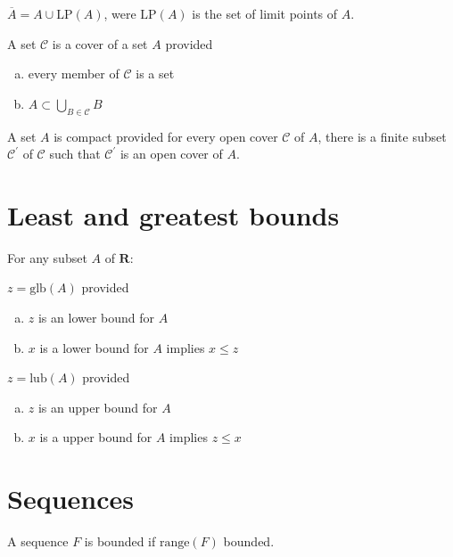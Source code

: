 \documentclass[letterpaper,landscape,9pt,fleqn]{extarticle}
\newcommand{\range}{\mathrm{range}}
\newcommand{\reals}{\mathbf{R}}
\newcommand{\glb}{\mathrm{glb}}
\newcommand{\lub}{\mathrm{lub}}
\newenvironment{alphalist}{
  \begin{enumerate}[(a)]
    \addtolength{\itemsep}{-1.0\itemsep}}
  {\end{enumerate}}
\begin{document}
\begin{multicols*}{3}
\begin{description}[\itemsep=0em]
    \item[Set closure] $\overline{A} = A \cup \mathrm{LP}(A)$, were $\mathrm{LP}(A)$ is the
    set of limit points of $A$.
    
    \item[Open cover] A set $\mathcal{C}$ is a cover of a set $A$ provided 
     \begin{alphalist}
         \item every member of $\mathcal{C}$ is a set
         \item $A \subset \underset{B \in \mathcal{C}}{\bigcup} B $
     \end{alphalist}

     \item[Compact] A set $A$ is compact provided for every 
     open cover $\mathcal{C}$ of $A$, there is a finite
     subset $\mathcal{C}^\prime$ of $\mathcal{C}$ such that
     $\mathcal{C}^\prime$ is an open cover of $A$.
     
    \end{description} 

\section*{Least and greatest bounds} 
For any subset $A$ of $\reals$:
\begin{description}[\itemsep=0em]
    \item[glb] $z = \glb(A)$ provided
    \begin{alphalist}
        \item $z$ is an lower bound for $A$
        \item $x$ is a lower bound for $A$ implies $x \leq z$
    \end{alphalist}
   \item[lub]  $z = \lub(A)$ provided
   \begin{alphalist}
       \item $z$ is an upper bound for $A$
       \item $x$ is a upper bound for $A$ implies $z \leq x$
   \end{alphalist}
\end{description}   
\section*{Sequences}
\begin{description}[\itemsep=0em]
\item[Bounded] A sequence $F$ is bounded if $\range(F)$ bounded.


\end{description}
\end{multicols*}
\end{document}
